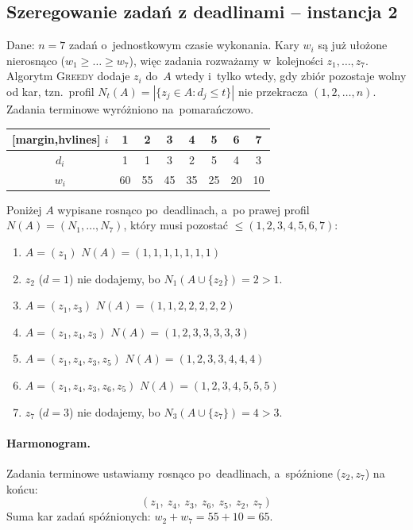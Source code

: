 \subsection{Szeregowanie zadań z deadlinami -- instancja 2}

Dane: $n = 7$ zadań o~jednostkowym czasie wykonania. Kary $w_i$ są już ułożone
nierosnąco ($w_1 \geq \dots \geq w_7$), więc zadania rozważamy w~kolejności
$z_1, \dots, z_7$. Algorytm \textsc{Greedy} dodaje $z_i$ do~$A$ wtedy i~tylko
wtedy, gdy zbiór pozostaje wolny od kar, tzn.\ profil
$N_t(A) = |\{z_j \in A : d_j \leq t\}|$ nie przekracza $(1, 2, \ldots, n)$.
Zadania terminowe wyróżniono na~\textcolor{accentB}{pomarańczowo}.

\begin{aztable}
	\centering
	\renewcommand{\arraystretch}{1.2}
	\begin{NiceTabular}{c|ccccccc}[margin,hvlines]
		$i$   & \color{accentB}1 & 2 & \color{accentB}3 & \color{accentB}4 & \color{accentB}5 & \color{accentB}6 & 7  \\
		\hline
		$d_i$ & \color{accentB}1 & 1 & \color{accentB}3 & \color{accentB}2 & \color{accentB}5 & \color{accentB}4 & 3  \\
		$w_i$ & \color{accentB}60 & 55 & \color{accentB}45 & \color{accentB}35 & \color{accentB}25 & \color{accentB}20 & 10
	\end{NiceTabular}
\end{aztable}

\begin{dygresja}
	Poniżej $A$ wypisane rosnąco po~deadlinach, a~po prawej profil
	$N(A) = (N_1, \ldots, N_7)$, który musi pozostać $\leq (1, 2, 3, 4, 5, 6, 7)$:
	\begin{enumerate}[nosep]
		\item $A = (z_1)$ \hfill $N(A) = (1, 1, 1, 1, 1, 1, 1)$
		\item $z_2$ ($d = 1$) nie dodajemy, bo $N_1(A \cup \{z_2\}) = 2 > 1$.
		\item $A = (z_1, z_3)$ \hfill $N(A) = (1, 1, 2, 2, 2, 2, 2)$
		\item $A = (z_1, z_4, z_3)$ \hfill $N(A) = (1, 2, 3, 3, 3, 3, 3)$
		\item $A = (z_1, z_4, z_3, z_5)$ \hfill $N(A) = (1, 2, 3, 3, 4, 4, 4)$
		\item $A = (z_1, z_4, z_3, z_6, z_5)$ \hfill $N(A) = (1, 2, 3, 4, 5, 5, 5)$
		\item $z_7$ ($d = 3$) nie dodajemy, bo $N_3(A \cup \{z_7\}) = 4 > 3$.
	\end{enumerate}
\end{dygresja}

\paragraph{Harmonogram.}
Zadania terminowe ustawiamy rosnąco po~deadlinach, a~spóźnione ($z_2, z_7$) na
końcu:
\[
	\boxed{(z_1,\ z_4,\ z_3,\ z_6,\ z_5,\ z_2,\ z_7)}
\]
Suma kar zadań spóźnionych: $w_2 + w_7 = 55 + 10 = 65$.
